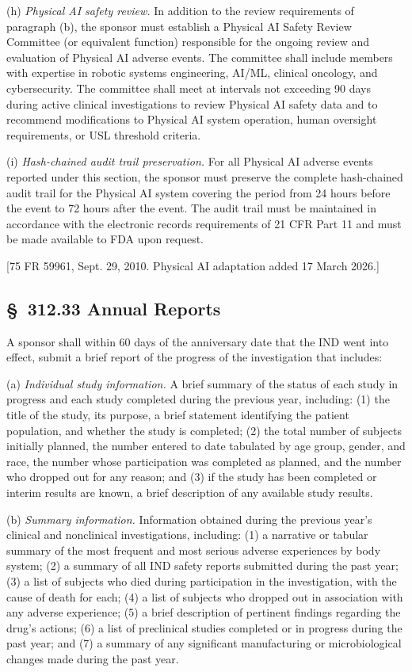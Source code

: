 \documentclass[11pt]{article}
\begin{document}
(h) \textit{Physical AI safety review.} In addition to the review requirements of paragraph (b), the sponsor must establish a Physical AI Safety Review Committee (or equivalent function) responsible for the ongoing review and evaluation of Physical AI adverse events. The committee shall include members with expertise in robotic systems engineering, AI/ML, clinical oncology, and cybersecurity. The committee shall meet at intervals not exceeding 90 days during active clinical investigations to review Physical AI safety data and to recommend modifications to Physical AI system operation, human oversight requirements, or USL threshold criteria.

(i) \textit{Hash-chained audit trail preservation.} For all Physical AI adverse events reported under this section, the sponsor must preserve the complete hash-chained audit trail for the Physical AI system covering the period from 24 hours before the event to 72 hours after the event. The audit trail must be maintained in accordance with the electronic records requirements of 21 CFR Part 11 and must be made available to FDA upon request.

[75 FR 59961, Sept. 29, 2010. Physical AI adaptation added 17 March 2026.]

\subsection{\S~312.33 Annual Reports}

A sponsor shall within 60 days of the anniversary date that the IND went into effect, submit a brief report of the progress of the investigation that includes:

(a) \textit{Individual study information.} A brief summary of the status of each study in progress and each study completed during the previous year, including: (1) the title of the study, its purpose, a brief statement identifying the patient population, and whether the study is completed; (2) the total number of subjects initially planned, the number entered to date tabulated by age group, gender, and race, the number whose participation was completed as planned, and the number who dropped out for any reason; and (3) if the study has been completed or interim results are known, a brief description of any available study results.

(b) \textit{Summary information.} Information obtained during the previous year's clinical and nonclinical investigations, including: (1) a narrative or tabular summary of the most frequent and most serious adverse experiences by body system; (2) a summary of all IND safety reports submitted during the past year; (3) a list of subjects who died during participation in the investigation, with the cause of death for each; (4) a list of subjects who dropped out in association with any adverse experience; (5) a brief description of pertinent findings regarding the drug's actions; (6) a list of preclinical studies completed or in progress during the past year; and (7) a summary of any significant manufacturing or microbiological changes made during the past year.
\end{document}
